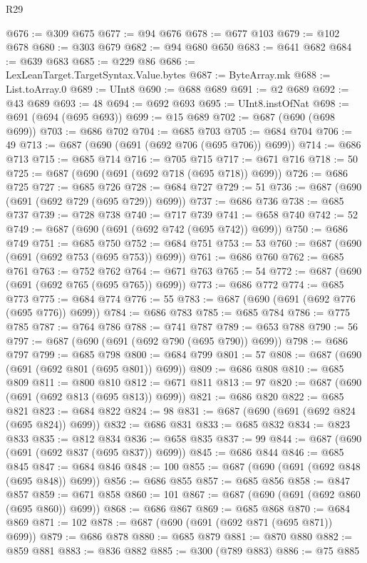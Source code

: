 \begin{lexlean}{R29}
\begin{coremodule}
@676 := @309 @675
@677 := @94 @676
@678 := @677 @103
@679 := @102 @678
@680 := @303 @679
@682 := @94 @680 @650
@683 := @641 @682
@684 := @639 @683
@685 := @229 @86
@686 := LexLeanTarget.TargetSyntax.Value.bytes
@687 := ByteArray.mk
@688 := List.toArray.{0}
@689 := UInt8
@690 := @688 @689
@691 := @2 @689
@692 := @43 @689
@693 := 48
@694 := @692 @693
@695 := UInt8.instOfNat
@698 := @691 (@694 (@695 @693))
@699 := @15 @689
@702 := @687 (@690 (@698 @699))
@703 := @686 @702
@704 := @685 @703
@705 := @684 @704
@706 := 49
@713 := @687 (@690 (@691 (@692 @706 (@695 @706)) @699))
@714 := @686 @713
@715 := @685 @714
@716 := @705 @715
@717 := @671 @716
@718 := 50
@725 := @687 (@690 (@691 (@692 @718 (@695 @718)) @699))
@726 := @686 @725
@727 := @685 @726
@728 := @684 @727
@729 := 51
@736 := @687 (@690 (@691 (@692 @729 (@695 @729)) @699))
@737 := @686 @736
@738 := @685 @737
@739 := @728 @738
@740 := @717 @739
@741 := @658 @740
@742 := 52
@749 := @687 (@690 (@691 (@692 @742 (@695 @742)) @699))
@750 := @686 @749
@751 := @685 @750
@752 := @684 @751
@753 := 53
@760 := @687 (@690 (@691 (@692 @753 (@695 @753)) @699))
@761 := @686 @760
@762 := @685 @761
@763 := @752 @762
@764 := @671 @763
@765 := 54
@772 := @687 (@690 (@691 (@692 @765 (@695 @765)) @699))
@773 := @686 @772
@774 := @685 @773
@775 := @684 @774
@776 := 55
@783 := @687 (@690 (@691 (@692 @776 (@695 @776)) @699))
@784 := @686 @783
@785 := @685 @784
@786 := @775 @785
@787 := @764 @786
@788 := @741 @787
@789 := @653 @788
@790 := 56
@797 := @687 (@690 (@691 (@692 @790 (@695 @790)) @699))
@798 := @686 @797
@799 := @685 @798
@800 := @684 @799
@801 := 57
@808 := @687 (@690 (@691 (@692 @801 (@695 @801)) @699))
@809 := @686 @808
@810 := @685 @809
@811 := @800 @810
@812 := @671 @811
@813 := 97
@820 := @687 (@690 (@691 (@692 @813 (@695 @813)) @699))
@821 := @686 @820
@822 := @685 @821
@823 := @684 @822
@824 := 98
@831 := @687 (@690 (@691 (@692 @824 (@695 @824)) @699))
@832 := @686 @831
@833 := @685 @832
@834 := @823 @833
@835 := @812 @834
@836 := @658 @835
@837 := 99
@844 := @687 (@690 (@691 (@692 @837 (@695 @837)) @699))
@845 := @686 @844
@846 := @685 @845
@847 := @684 @846
@848 := 100
@855 := @687 (@690 (@691 (@692 @848 (@695 @848)) @699))
@856 := @686 @855
@857 := @685 @856
@858 := @847 @857
@859 := @671 @858
@860 := 101
@867 := @687 (@690 (@691 (@692 @860 (@695 @860)) @699))
@868 := @686 @867
@869 := @685 @868
@870 := @684 @869
@871 := 102
@878 := @687 (@690 (@691 (@692 @871 (@695 @871)) @699))
@879 := @686 @878
@880 := @685 @879
@881 := @870 @880
@882 := @859 @881
@883 := @836 @882
@885 := @300 (@789 @883)
@886 := @75 @885

\end{coremodule}
\end{lexlean}
